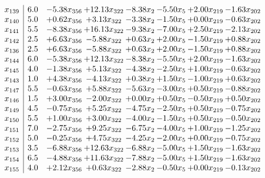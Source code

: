 \documentclass[8pt]{article}
\begin{document}
\[\begin{array}{c| c c@{\hskip 2pt} c@{\hskip 2pt} c@{\hskip 2pt} c@{\hskip 2pt} c@{\hskip 2pt} c@{\hskip 2pt} }
 x_{139}   &  6.0 & -5.38 x_{356} & + 12.13 x_{322} & -8.38 x_{2} & -5.50 x_{5} & +  2.00 x_{219} & -1.63 x_{202}\\
 x_{140}   &  5.0 & +  0.62 x_{356} & +  3.13 x_{322} & -3.38 x_{2} & -1.50 x_{5} & +  0.00 x_{219} & -0.63 x_{202}\\
 x_{141}   &  5.5 & -8.38 x_{356} & + 16.13 x_{322} & -9.38 x_{2} & -7.00 x_{5} & +  2.50 x_{219} & -2.13 x_{202}\\
 x_{142}   &  2.5 & +  6.63 x_{356} & -5.88 x_{322} & +  0.63 x_{2} & +  2.00 x_{5} & -1.50 x_{219} & +  0.88 x_{202}\\
 x_{136}   &  2.5 & +  6.63 x_{356} & -5.88 x_{322} & +  0.63 x_{2} & +  2.00 x_{5} & -1.50 x_{219} & +  0.88 x_{202}\\
 x_{144}   &  6.0 & -5.38 x_{356} & + 12.13 x_{322} & -8.38 x_{2} & -5.50 x_{5} & +  2.00 x_{219} & -1.63 x_{202}\\
 x_{145}   &  4.0 & -1.38 x_{356} & +  5.13 x_{322} & -4.38 x_{2} & -2.50 x_{5} & +  1.00 x_{219} & -0.63 x_{202}\\
 x_{143}   &  1.0 & +  4.38 x_{356} & -4.13 x_{322} & +  0.38 x_{2} & +  1.50 x_{5} & -1.00 x_{219} & +  0.63 x_{202}\\
 x_{147}   &  5.5 & -0.63 x_{356} & +  5.88 x_{322} & -5.63 x_{2} & -3.00 x_{5} & +  0.50 x_{219} & -0.88 x_{202}\\
 x_{146}   &  1.5 & +  3.00 x_{356} & -2.00 x_{322} & +  0.00 x_{2} & +  0.50 x_{5} & -0.50 x_{219} & +  0.50 x_{202}\\
 x_{149}   &  4.5 & -0.75 x_{356} & +  5.25 x_{322} & -4.75 x_{2} & -2.50 x_{5} & +  0.50 x_{219} & -0.75 x_{202}\\
 x_{150}   &  5.5 & +  1.00 x_{356} & +  3.00 x_{322} & -4.00 x_{2} & -1.50 x_{5} & +  0.50 x_{219} & -0.50 x_{202}\\
 x_{151}   &  7.0 & -2.75 x_{356} & +  9.25 x_{322} & -6.75 x_{2} & -4.00 x_{5} & +  1.00 x_{219} & -1.25 x_{202}\\
 x_{152}   &  5.0 & -0.25 x_{356} & +  4.75 x_{322} & -4.25 x_{2} & -2.00 x_{5} & +  0.00 x_{219} & -0.75 x_{202}\\
 x_{153}   &  3.5 & -6.88 x_{356} & + 12.63 x_{322} & -6.88 x_{2} & -5.00 x_{5} & +  1.50 x_{219} & -1.63 x_{202}\\
 x_{154}   &  6.5 & -4.88 x_{356} & + 11.63 x_{322} & -7.88 x_{2} & -5.00 x_{5} & +  1.50 x_{219} & -1.63 x_{202}\\
 x_{155}   &  4.0 & +  2.12 x_{356} & +  0.63 x_{322} & -2.88 x_{2} & -0.50 x_{5} & +  0.00 x_{219} & -0.13 x_{202}\\

\end{array}\]
\end{document}
